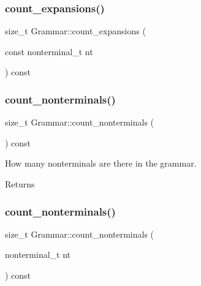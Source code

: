 \mbox{\label{class_grammar_a9c015fe6f16191ddb2f21a51f1931a05}} 
\subsubsection{\texorpdfstring{count\+\_\+expansions()}{count\_expansions()}}
{\footnotesize\ttfamily size\+\_\+t Grammar\+::count\+\_\+expansions (\begin{DoxyParamCaption}\item[{const nonterminal\+\_\+t}]{nt }\end{DoxyParamCaption}) const\hspace{0.3cm}{\ttfamily [inline]}}

\mbox{\label{class_grammar_abf841bc64ac19cb9872a8362f5e5731a}} 
\subsubsection{\texorpdfstring{count\+\_\+nonterminals()}{count\_nonterminals()}\hspace{0.1cm}{\footnotesize\ttfamily [1/2]}}
{\footnotesize\ttfamily size\+\_\+t Grammar\+::count\+\_\+nonterminals (\begin{DoxyParamCaption}{ }\end{DoxyParamCaption}) const\hspace{0.3cm}{\ttfamily [inline]}}

How many nonterminals are there in the grammar. \begin{DoxyReturn}{Returns}

\end{DoxyReturn}
\mbox{\label{class_grammar_a0714d68070749932d876fe868bde94bd}} 
\subsubsection{\texorpdfstring{count\+\_\+nonterminals()}{count\_nonterminals()}\hspace{0.1cm}{\footnotesize\ttfamily [2/2]}}
{\footnotesize\ttfamily size\+\_\+t Grammar\+::count\+\_\+nonterminals (\begin{DoxyParamCaption}\item[{nonterminal\+\_\+t}]{nt }\end{DoxyParamCaption}) const\hspace{0.3cm}{\ttfamily [inline]}}

